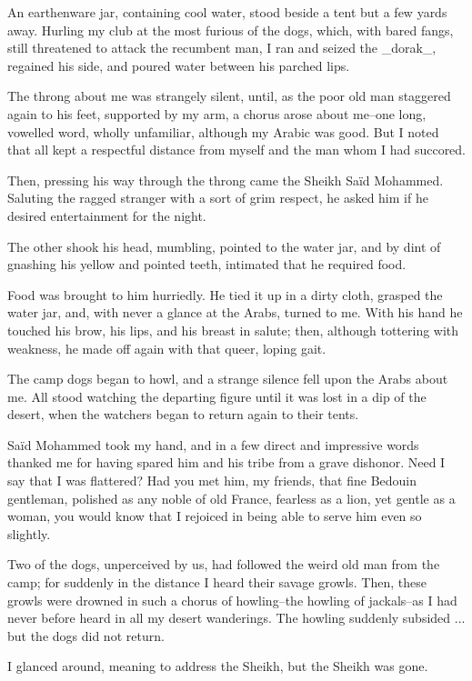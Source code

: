 An earthenware jar, containing cool water, stood beside a tent but
a few yards away. Hurling my club at the most furious of the dogs,
which, with bared fangs, still threatened to attack the recumbent man,
I ran and seized the _dorak_, regained his side, and poured water
between his parched lips.

The throng about me was strangely silent, until, as the poor old man
staggered again to his feet, supported by my arm, a chorus arose about
me--one long, vowelled word, wholly unfamiliar, although my Arabic was
good. But I noted that all kept a respectful distance from myself and
the man whom I had succored.

Then, pressing his way through the throng came the Sheikh Saïd
Mohammed. Saluting the ragged stranger with a sort of grim respect,
he asked him if he desired entertainment for the night.

The other shook his head, mumbling, pointed to the water jar, and by
dint of gnashing his yellow and pointed teeth, intimated that he
required food.

Food was brought to him hurriedly. He tied it up in a dirty cloth,
grasped the water jar, and, with never a glance at the Arabs, turned
to me. With his hand he touched his brow, his lips, and his breast in
salute; then, although tottering with weakness, he made off again with
that queer, loping gait.

The camp dogs began to howl, and a strange silence fell upon the Arabs
about me. All stood watching the departing figure until it was lost in
a dip of the desert, when the watchers began to return again to their
tents.

Saïd Mohammed took my hand, and in a few direct and impressive words
thanked me for having spared him and his tribe from a grave dishonor.
Need I say that I was flattered? Had you met him, my friends, that
fine Bedouin gentleman, polished as any noble of old France, fearless
as a lion, yet gentle as a woman, you would know that I rejoiced in
being able to serve him even so slightly.

Two of the dogs, unperceived by us, had followed the weird old man
from the camp; for suddenly in the distance I heard their savage
growls. Then, these growls were drowned in such a chorus of
howling--the howling of jackals--as I had never before heard in all my
desert wanderings. The howling suddenly subsided ... but the dogs did
not return.

I glanced around, meaning to address the Sheikh, but the Sheikh was
gone.

